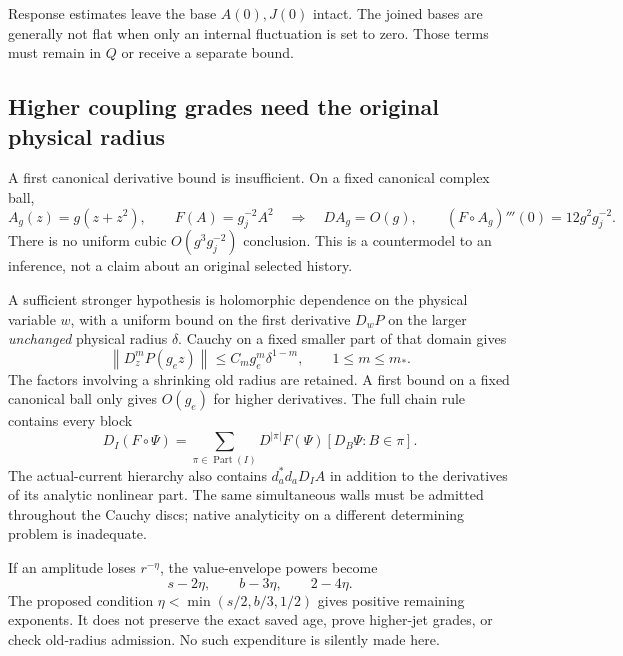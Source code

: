 \documentclass[11pt,letterpaper]{article}
\numberwithin{equation}{section}
\theoremstyle{plain}
\theoremstyle{remark}\newtheorem{remark}[theorem]{Scope}
\DeclareMathOperator{\Part}{Part}\DeclareMathOperator{\Ad}{Ad}
\newcommand{\norm}[1]{\left\lVert#1\right\rVert}
\begin{document}
Response estimates leave the base $A(0),J(0)$ intact. The joined bases
are generally not flat when only an internal fluctuation is set to zero.
Those terms must remain in $Q$ or receive a separate bound.

\subsection{Higher coupling grades need the original physical radius}

A first canonical derivative bound is insufficient. On a fixed canonical
complex ball,
\begin{equation}
 A_g(z)=g(z+z^2),\qquad F(A)=g_j^{-2}A^2
 \quad\Longrightarrow\quad
 DA_g=O(g),\qquad (F\circ A_g)'''(0)=12g^2g_j^{-2}.
 \label{eq:jetcounter}
\end{equation}
There is no uniform cubic $O(g^3g_j^{-2})$ conclusion. This is a countermodel
to an inference, not a claim about an original selected history.

A sufficient stronger hypothesis is holomorphic dependence on the
physical variable $w$, with a uniform bound on the first derivative
$D_wP$ on the larger \emph{unchanged} physical radius $\delta$.
Cauchy on a fixed smaller part of that domain gives
\begin{equation}
 \norm{D_z^mP(g_ez)}\le C_mg_e^m\delta^{1-m},\qquad 1\le m\le m_*.
 \label{eq:cauchy}
\end{equation}
The factors involving a shrinking old radius are retained. A first bound
on a fixed canonical ball only gives $O(g_e)$ for higher derivatives.
The full chain rule contains every block
\begin{equation}
 D_I(F\circ\Psi)
 =\sum_{\pi\in\Part(I)}D^{|\pi|}F(\Psi)
      [D_B\Psi:B\in\pi].
\end{equation}
The actual-current hierarchy also contains
$d_a^*d_aD_IA$ in addition to the derivatives of its analytic nonlinear
part. The same simultaneous walls must be admitted throughout the Cauchy
discs; native analyticity on a different determining problem is inadequate.

If an amplitude loses $r^{-\eta}$, the value-envelope powers become
\begin{equation}
 s-2\eta,\qquad b-3\eta,\qquad 2-4\eta.
\end{equation}
The proposed condition
$\eta<\min(s/2,b/3,1/2)$ gives positive remaining exponents. It does not
preserve the exact saved age, prove higher-jet grades, or check old-radius
admission. No such expenditure is silently made here.
\end{document}
